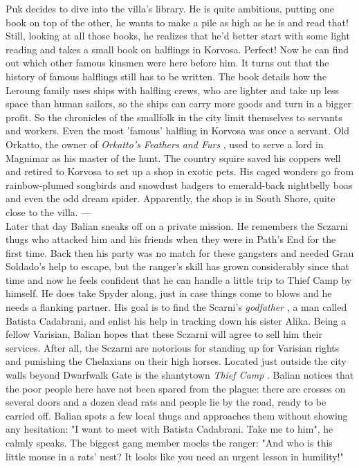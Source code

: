 Puk decides to dive into the villa's library. He is quite ambitious, putting one book on top of the other, he wants to make a pile as high as he is and read that! Still, looking at all those books, he realizes that he'd better start with some light reading and takes a small book on halflings in Korvosa. Perfect! Now he can find out which other famous kinsmen were here before him. It turns out that the history of famous halflings still has to be written. The book details how the Leroung family uses ships with halfling crews, who are lighter and take up less space than human sailors, so the ships can carry more goods and turn in a bigger profit. So the chronicles of the smallfolk in the city limit themselves to servants and workers. Even the most 'famous' halfling in Korvosa was once a servant. Old Orkatto, the owner of {\itshape Orkatto's Feathers and Furs} , used to serve a lord in Magnimar as his master of the hunt. The country squire saved his coppers well and retired to Korvosa to set up a shop in exotic pets. His caged wonders go from rainbow-plumed songbirds and snowdust badgers to emerald-back nightbelly boas and even the odd dream spider. Apparently, the shop is in South Shore, quite close to the villa. ---\\

Later that day Balian sneaks off on a private mission. He remembers the Sczarni thugs who attacked him and his friends when they were in Path's End for the first time. Back then his party was no match for these gangsters and needed Grau Soldado's help to escape, but the ranger's skill has grown considerably since that time and now he feels confident that he can handle a little trip to Thief Camp by himself. He does take Spyder along, just in case things come to blows and he needs a flanking partner. His goal is to find the Scarni's {\itshape godfather} , a man called Batista Cadabrani, and enlist his help in tracking down his sister Alika. Being a fellow Varisian, Balian hopes that these Sczarni will agree to sell him their services. After all, the Sczarni are notorious for standing up for Varisian rights and punishing the Chelaxians on their high horses. Located just outside the city walls beyond Dwarfwalk Gate is the shantytown {\itshape Thief Camp} . Balian notices that the poor people here have not been spared from the plague: there are crosses on several doors and a dozen dead rats and people lie by the road, ready to be carried off. Balian spots a few local thugs and approaches them without showing any hesitation: "I want to meet with Batista Cadabrani. Take me to him", he calmly speaks. The biggest gang member mocks the ranger: "And who is this little mouse in a rats' nest? It looks like you need an urgent lesson in humility!"\\

